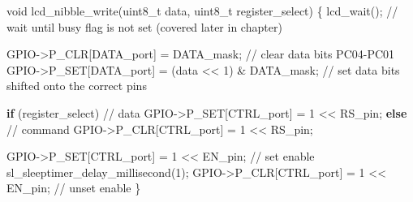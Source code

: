 \documentclass[
  9pt,
  letterpaper,
  abstract,
  titlepage]{scrbook}
\newenvironment{Shaded}{\begin{snugshade}}{\end{snugshade}}
\newcommand{\CommentTok}[1]{\textcolor[rgb]{0.37,0.37,0.37}{#1}}
\newcommand{\ControlFlowTok}[1]{\textcolor[rgb]{0.00,0.23,0.31}{\textbf{#1}}}
\newcommand{\DataTypeTok}[1]{\textcolor[rgb]{0.68,0.00,0.00}{#1}}
\newcommand{\DecValTok}[1]{\textcolor[rgb]{0.68,0.00,0.00}{#1}}
\newcommand{\NormalTok}[1]{\textcolor[rgb]{0.00,0.23,0.31}{#1}}
\newcommand{\OperatorTok}[1]{\textcolor[rgb]{0.37,0.37,0.37}{#1}}
\begin{document}
\begin{Shaded}
\begin{Highlighting}[]
\DataTypeTok{void}\NormalTok{ lcd\_nibble\_write}\OperatorTok{(}\DataTypeTok{uint8\_t}\NormalTok{ data}\OperatorTok{,} \DataTypeTok{uint8\_t}\NormalTok{ register\_select}\OperatorTok{)}
\OperatorTok{\{}
\NormalTok{    lcd\_wait}\OperatorTok{();} \CommentTok{// wait until busy flag is not set (covered later in chapter)}

\NormalTok{    GPIO}\OperatorTok{{-}\textgreater{}}\NormalTok{P\_CLR}\OperatorTok{[}\NormalTok{DATA\_port}\OperatorTok{]} \OperatorTok{=}\NormalTok{ DATA\_mask}\OperatorTok{;}               \CommentTok{// clear data bits PC04{-}PC01}
\NormalTok{    GPIO}\OperatorTok{{-}\textgreater{}}\NormalTok{P\_SET}\OperatorTok{[}\NormalTok{DATA\_port}\OperatorTok{]} \OperatorTok{=} \OperatorTok{(}\NormalTok{data }\OperatorTok{\textless{}\textless{}} \DecValTok{1}\OperatorTok{)} \OperatorTok{\&}\NormalTok{ DATA\_mask}\OperatorTok{;} \CommentTok{// set data bits shifted onto the correct pins}

    \ControlFlowTok{if} \OperatorTok{(}\NormalTok{register\_select}\OperatorTok{)} \CommentTok{// data}
\NormalTok{        GPIO}\OperatorTok{{-}\textgreater{}}\NormalTok{P\_SET}\OperatorTok{[}\NormalTok{CTRL\_port}\OperatorTok{]} \OperatorTok{=} \DecValTok{1} \OperatorTok{\textless{}\textless{}}\NormalTok{ RS\_pin}\OperatorTok{;}
    \ControlFlowTok{else} \CommentTok{// command}
\NormalTok{        GPIO}\OperatorTok{{-}\textgreater{}}\NormalTok{P\_CLR}\OperatorTok{[}\NormalTok{CTRL\_port}\OperatorTok{]} \OperatorTok{=} \DecValTok{1} \OperatorTok{\textless{}\textless{}}\NormalTok{ RS\_pin}\OperatorTok{;}

\NormalTok{    GPIO}\OperatorTok{{-}\textgreater{}}\NormalTok{P\_SET}\OperatorTok{[}\NormalTok{CTRL\_port}\OperatorTok{]} \OperatorTok{=} \DecValTok{1} \OperatorTok{\textless{}\textless{}}\NormalTok{ EN\_pin}\OperatorTok{;} \CommentTok{// set enable}
\NormalTok{    sl\_sleeptimer\_delay\_millisecond}\OperatorTok{(}\DecValTok{1}\OperatorTok{);}
\NormalTok{    GPIO}\OperatorTok{{-}\textgreater{}}\NormalTok{P\_CLR}\OperatorTok{[}\NormalTok{CTRL\_port}\OperatorTok{]} \OperatorTok{=} \DecValTok{1} \OperatorTok{\textless{}\textless{}}\NormalTok{ EN\_pin}\OperatorTok{;} \CommentTok{// unset enable}
\OperatorTok{\}}
\end{Highlighting}
\end{Shaded}
\end{document}
